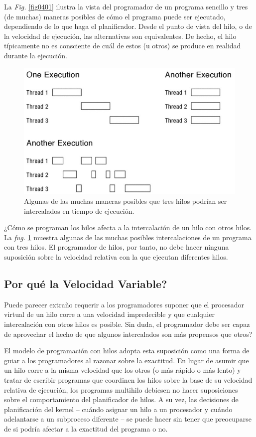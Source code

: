 \documentclass[10pt]{book}
\begin{document}
La \textit{Fig.} \ref{fig0401} ilustra la vista del programador de un programa sencillo y tres (de muchas) maneras posibles de cómo el programa puede ser ejecutado, dependiendo de lo que haga el planificador. Desde el punto de vista del hilo, o de la velocidad de ejecución, las alternativas son equivalentes. De hecho, el hilo típicamente no es consciente de cuál de estos (u otros) se produce en realidad durante la ejecución.

\begin{figure}[tbhp]
\centerline{\includegraphics[scale=0.55]{img/fig0402}}
\caption{Algunas de las muchas maneras posibles que tres hilos podrían ser intercalados en tiempo de ejecución.}
\label{fig0402}
\end{figure}

¿Cómo se programan los hilos afecta a la intercalación de un hilo con otros hilos. La \textit{fug.} \ref{fig0402} muestra algunas de las muchas posibles intercalaciones de un programa con tres hilos. El programador de hilos, por tanto, no debe hacer ninguna suposición sobre la velocidad relativa con la que ejecutan diferentes hilos.

\subsection{Por qué la Velocidad Variable?}
Puede parecer extraño requerir a los programadores suponer que el procesador virtual de un hilo corre a una velocidad impredecible y que cualquier intercalación con otros hilos es posible. Sin duda, el programador debe ser capaz de aprovechar el hecho de que algunos intercalados son más propensos que otros?

El modelo de programación con hilos adopta esta suposición como una forma de guiar a los programadores al razonar sobre la exactitud. En lugar de asumir que un hilo corre a la misma velocidad que los otros (o más rápido o más lento) y tratar de escribir programas que coordinen los hilos sobre la base de su velocidad relativa de ejecución, los programas multihilo debiesen no hacer suposiciones sobre el comportamiento del planificador de hilos. A su vez, las decisiones de planificación del kernel -- cuándo asignar un hilo a un procesador y cuándo adelantarse a un subproceso diferente -- se puede hacer sin tener que preocuparse de si podría afectar a la exactitud del programa o no.
\end{document}
